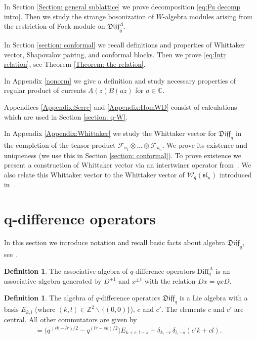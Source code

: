 \documentclass[pdftex]{sigma}
\numberwithin{equation}{section}
\theoremstyle{definition}
\newtheorem{Definition}[Theorem]{Definition}
\newcommand{\qaD}{\mathrm{Diff}_q^{\, \mathrm{A}}}
\newcommand{\qD}{\mathfrak{Diff}_q}
\begin{document}
In Section \ref{Section: general sublattice} we prove decomposition \eqref{eq:Fu decomp intro}. Then we study the strange bosonization of $W$-algebra modules arising from the restriction of Fock module on $\qD^{\Lambda}$.

In Section \ref{section: conformal} we recall definitions and properties of Whittaker vector, Shapovalov pairing, and conformal blocks. Then we prove \eqref{eq:Intr relation}, see Theorem \ref{Theorem: the relation}.

In Appendix \ref{nonorm} we give a definition and study necessary properties of regular product of currents $A(z) B(az)$ for $a\in \mathbb{C}$.

Appendices \ref{Appendix:Serre} and \ref{Appendix:HomWD} consist of calculations which are used in Section \ref{section: q-W}.

In Appendix \ref{Appendix:Whittaker} we study the Whittaker vector for $\qD$ in the completion of the tensor product $ \mathcal{F}_{u_1}\otimes\dots \otimes\mathcal{F}_{u_n}$. We prove its existence and uniqueness (we use this in Section \ref{section: conformal}). To prove existence we present a construction of Whittaker vector via an intertwiner operator from~\cite{AFS}. We also relate this Whittaker vector to the Whittaker vector of $\mathcal{W}_q(\mathfrak{sl}_n)$ introduced in~\cite{T}.

\section[$q$-difference operators]{$\boldsymbol{q}$-difference operators} \label{q-dif}

In this section we introduce notation and recall basic facts about algebra $\qD$, see \cite{FFZ, GL,KR93}.
\begin{Definition}
The associative algebra of $q$-difference operators $\qaD$ is an associative algebra generated by $D^{\pm 1}$ and $x^{\pm 1}$ with the relation $Dx=qxD$.
\end{Definition}

\begin{Definition}
The algebra of $q$-difference operators $\qD$ is a Lie algebra with a basis $E_{k,l}$ {\upshape(}where $(k, l) \in \mathbb{Z}^2 \backslash \{(0,0) \}${\upshape)}, $c$ and $c'$. The elements $c$ and $c'$ are central. All other commutators are given by
\begin{gather}
[ E_{k,l} , E_{r,s} ] = \big( q^{(sk-lr)/2}-q^{(lr-sk)/2} \big) E_{k+r, l+s} + \delta_{k, -r} \, \delta_{l, -s} ( c' k + c l ). \label{qDc}
\end{gather}
\end{Definition}
\end{document}
